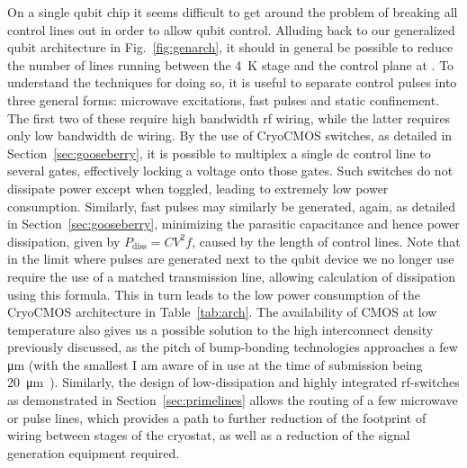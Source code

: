 On a single qubit chip it seems difficult to get around the problem of breaking all control lines out in order to allow qubit control. Alluding
back to our generalized qubit architecture in Fig.~\ref{fig:genarch}, it should in general be possible to reduce the number of lines running between the \SI{4}{\kelvin} stage
and the control plane at \si{\mk}. To understand the techniques for doing so, it is useful to separate control pulses into three general forms: microwave excitations,
fast pulses and static confinement. The first two of these require high bandwidth rf wiring, while the latter requires only low bandwidth dc wiring. By the use of
CryoCMOS switches, as detailed in Section~\ref{sec:gooseberry}, it is possible to multiplex a single dc control line to several gates, effectively locking
a voltage onto those gates. Such switches do not dissipate power except when toggled, leading to extremely low power consumption. Similarly, fast pulses may similarly
be generated, again, as detailed in Section~\ref{sec:gooseberry}, minimizing the parasitic capacitance and hence power dissipation, given by $P_\textrm{diss} = CV^2f$,
caused by the length of control lines. Note that in the limit where pulses are generated next to the qubit device we no longer use require the use of a matched transmission
line, allowing calculation of dissipation using this formula. This in turn leads to the low power consumption of the CryoCMOS architecture in Table~\ref{tab:arch}.
The availability of CMOS at low temperature also gives us a possible solution to the high interconnect density previously discussed, as the pitch of bump-bonding
technologies approaches a few \si{\micro\meter} (with the smallest I am aware of in use at the time of submission being \SI{20}{\micro\meter}~\cite{4550089}).
Similarly, the design of low-dissipation and highly integrated rf-switches as demonstrated in Section~\ref{sec:primelines} allows the routing of a few microwave
or pulse lines, which provides a path to further reduction of the footprint of wiring between stages of the cryostat, as well as a reduction of the signal
generation equipment required.

